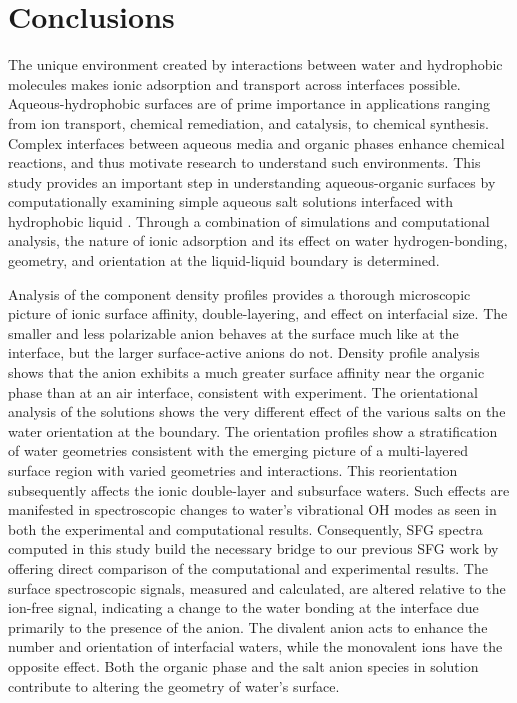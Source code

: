 \section{Conclusions}

The unique environment created by interactions between water and hydrophobic molecules makes ionic adsorption and transport across interfaces possible. Aqueous-hydrophobic surfaces are of prime importance in applications ranging from ion transport, chemical remediation, and catalysis, to chemical synthesis. Complex interfaces between aqueous media and organic phases enhance chemical reactions, and thus motivate research to understand such environments. This study provides an important step in understanding aqueous-organic surfaces by computationally examining simple aqueous salt solutions interfaced with hydrophobic liquid \ctc. Through a combination of simulations and computational analysis, the nature of ionic adsorption and its effect on water hydrogen-bonding, geometry, and orientation at the liquid-liquid boundary is determined.

Analysis of the component density profiles provides a thorough microscopic picture of ionic surface affinity, double-layering, and effect on interfacial size. The smaller and less polarizable \cl anion behaves at the \ctcwat surface much like at the \airwat interface, but the larger surface-active anions do not. Density profile analysis shows that the \nit anion exhibits a much greater surface affinity near the organic phase than at an air interface, consistent with experiment. The orientational analysis of the solutions shows the very different effect of the various salts on the water orientation at the \ctcwat boundary. The orientation profiles show a stratification of water geometries consistent with the emerging picture of a multi-layered surface region with varied geometries and interactions. This reorientation subsequently affects the ionic double-layer and subsurface waters. Such effects are manifested in spectroscopic changes to water's vibrational OH modes as seen in both the experimental and computational results. Consequently, SFG spectra computed in this study build the necessary bridge to our previous SFG work by offering direct comparison of the computational and experimental results. The surface spectroscopic signals, measured and calculated, are altered relative to the ion-free signal, indicating a change to the water bonding at the interface due primarily to the presence of the anion. The divalent \sul anion acts to enhance the number and orientation of interfacial waters, while the monovalent ions have the opposite effect. Both the organic phase and the salt anion species in solution contribute to altering the geometry of water's surface. 

